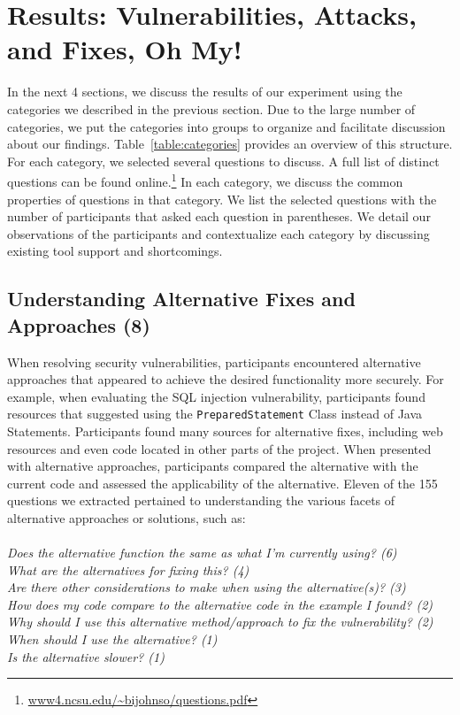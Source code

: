 \documentclass[conference]{IEEEtran}
\begin{document}
\section{Results: Vulnerabilities, Attacks, and Fixes, Oh My!}
\label{sec:results-vaf}
In the next 4 sections, we discuss the results of our experiment using the categories we described in the previous section.
Due to the large number of categories, we put the categories into groups to organize and facilitate discussion about our findings. Table~\ref{table:categories} provides an overview of this structure.
For each category, we selected several questions to discuss. A full list of distinct questions can be found online.\footnote{\url{www4.ncsu.edu/~bijohnso/questions.pdf}}
In each category, we discuss the common properties of questions in that category.
We list the selected questions with the number of participants that asked each question in parentheses.  
We detail our observations of the participants and contextualize each category by discussing existing tool support and shortcomings.



\noindent\subsection{\textbf{Understanding Alternative Fixes and Approaches (8)}}\label{uafa}

When resolving security vulnerabilities, participants encountered alternative approaches that appeared to achieve the desired functionality more securely.
For example, when evaluating the SQL injection vulnerability, participants found resources that suggested using the \texttt{PreparedStatement} Class instead of Java Statements. 
Participants found many sources for alternative fixes, including web resources and even code located in other parts of the project.
When presented with alternative approaches, participants compared the alternative with the current code and assessed the applicability of the alternative. 
Eleven of the 155 questions we extracted pertained to understanding the various facets of alternative approaches or solutions, such as:
\\
\\
\noindent\emph{Does the alternative function the same as what I'm currently using? (6)} \\
\emph{What are the alternatives for fixing this? (4)} \\
\emph{Are there other considerations to make when using the alternative(s)? (3)} \\
\emph{How does my code compare to the alternative code in the example I found? (2)}
\emph{Why should I use this alternative method/approach to fix the vulnerability? (2)} \\
\emph{When should I use the alternative? (1)} \\
\emph{Is the alternative slower? (1)} \\
\end{document}
